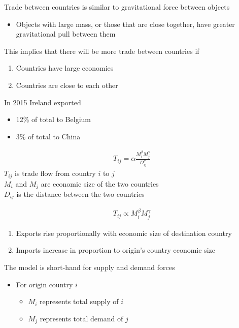 \documentclass{beamer}
\begin{document}
\begin{frame}
  Trade between countries is similar to gravitational force between objects
  \begin{itemize}
    \item Objects with large mass, or those that are close together, have greater gravitational pull between them
  \end{itemize}
  \medskip
  This implies that there will be more trade between countries if
    \begin{enumerate}
      \item Countries have large economies
      \item Countries are close to each other
    \end{enumerate}    
\end{frame}

\begin{frame}
  In 2015 Ireland exported 
  \begin{itemize}
    \item 12\% of total to Belgium
    \item 3\% of total to China
  \end{itemize}
\end{frame}

\begin{frame}
  \begin{align*}
    T_{ij}=\alpha \frac{M_i^{\beta} M_j^{\gamma}}{D_{ij}^{\theta}}
  \end{align*}
$T_{ij}$ is trade flow from country $i$ to $j$\\
$M_i$ and $M_j$ are economic size of the two countries\\
$D_{ij}$ is the distance between the two countries
\end{frame}

\begin{frame}
  \begin{align*}
    T_{ij}\propto M_i^{\beta} M_j^{\gamma}
  \end{align*}
\begin{enumerate}
  \item Exports rise proportionally with economic size of destination country
  \item Imports increase in proportion to origin's country economic size
\end{enumerate}

  The model is short-hand for supply and demand forces
\begin{itemize}
  \item For origin country $i$
  \begin{itemize}
    \item $M_i$ represents total supply of $i$
    \item $M_j$ represents total demand of $j$
  \end{itemize}
\end{itemize}
\end{frame}
\end{document}
